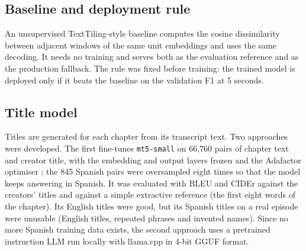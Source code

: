 \subsection*{Baseline and deployment rule}

An unsupervised TextTiling-style baseline \cite{hearst1997texttiling} computes the cosine dissimilarity between adjacent windows of the same unit embeddings and uses the same decoding. It needs no training and serves both as the evaluation reference and as the production fallback. The rule was fixed before training: the trained model is deployed only if it beats the baseline on the validation F1 at 5 seconds.

\subsection*{Title model}

Titles are generated for each chapter from its transcript text. Two approaches were developed. The first fine-tunes \texttt{mt5-small} \cite{xue2021mt5} on 66{,}760 pairs of chapter text and creator title, with the embedding and output layers frozen and the Adafactor optimiser \cite{shazeer2018adafactor}; the 845 Spanish pairs were oversampled eight times so that the model keeps answering in Spanish. It was evaluated with BLEU \cite{papineni2002bleu} and CIDEr \cite{vedantam2015cider} against the creators' titles and against a simple extractive reference (the first eight words of the chapter). Its English titles were good, but its Spanish titles on a real episode were unusable (English titles, repeated phrases and invented names). Since no more Spanish training data exists, the second approach uses a pretrained instruction LLM run locally with llama.cpp \cite{llamacpp} in 4-bit GGUF format.

